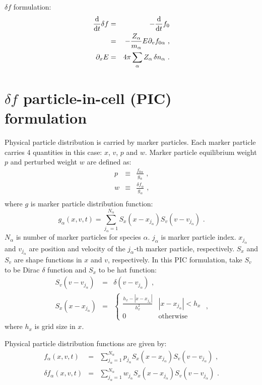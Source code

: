 \documentclass[12pt]{article}
\begin{document}
$\delta f$ formulation:
\begin{eqnarray}
	\frac{\mathrm{d}}{\mathrm{d} t} \delta f & = & - \frac{\mathrm{d}}{\mathrm{d} t} f_0 \nonumber \\
	& = & - \frac{Z_\alpha}{m_\alpha} E \partial_v f_{0 \alpha} \textrm{ ,} \\
	\partial_x E & = & 4 \pi \sum_\alpha Z_\alpha \,\delta n_\alpha \textrm{ .}
\end{eqnarray}


\section{$\delta f$ particle-in-cell (PIC) formulation}
\label{sec:df_pic}

Physical particle distribution is carried by marker particles.
Each marker particle carries 4 quantities in this case: $x$, $v$, $p$ and $w$.
Marker particle equilibrium weight $p$ and perturbed weight $w$ are defined as:
\begin{eqnarray}
	p & \equiv & \frac{f_{0 \alpha}}{g_\alpha} \textrm{ ,} \\
	w & \equiv & \frac{\delta f_\alpha}{g_\alpha} \textrm{ ,} \\
\end{eqnarray}
where $g$ is marker particle distribution function:
\begin{equation}
	g_\alpha(x, v, t) = \sum_{j_\alpha = 1}^{N_\alpha} S_x(x - x_{j_\alpha}) S_v(v - v_{j_\alpha}) \textrm{ .}
\end{equation}
$N_\alpha$ is number of marker particles for species $\alpha$.
$j_\alpha$ is marker particle index.
$x_{j_\alpha}$ and $v_{j_\alpha}$ are position and velocity of the $j_{\alpha}$-th marker particle, respectively.
$S_x$ and $S_v$ are shape functions in $x$ and $v$, respectively.
In this PIC formulation, take $S_v$ to be Dirac $\delta$ function and $S_x$ to be hat function:
\begin{eqnarray}
	S_v(v - v_{j_\alpha}) & = & \delta(v - v_{j_\alpha}) \textrm{ ,} \\
	S_x(x - x_{j_\alpha}) & = & \left\{ \begin{array}{ll}
		\frac{h_x - |x - x_{j_\alpha}|}{h_x^2} & |x - x_{j_\alpha}| < h_x \\
		0 & \textrm{otherwise}
	\end{array} \right. \textrm{ ,}
\end{eqnarray}
where $h_x$ is grid size in $x$.

Physical particle distribution functions are given by:
\begin{eqnarray}
	f_\alpha(x, v, t) & = & \sum_{j_\alpha = 1}^{N_\alpha} p_{j_\alpha} S_x(x - x_{j_\alpha}) S_v(v - v_{j_\alpha}) \textrm{ ,} \\
	\delta f_\alpha(x, v, t) & = & \sum_{j_\alpha = 1}^{N_\alpha} w_{j_\alpha} S_x(x - x_{j_\alpha}) S_v(v - v_{j_\alpha}) \textrm{ .}
\end{eqnarray}
\end{document}
